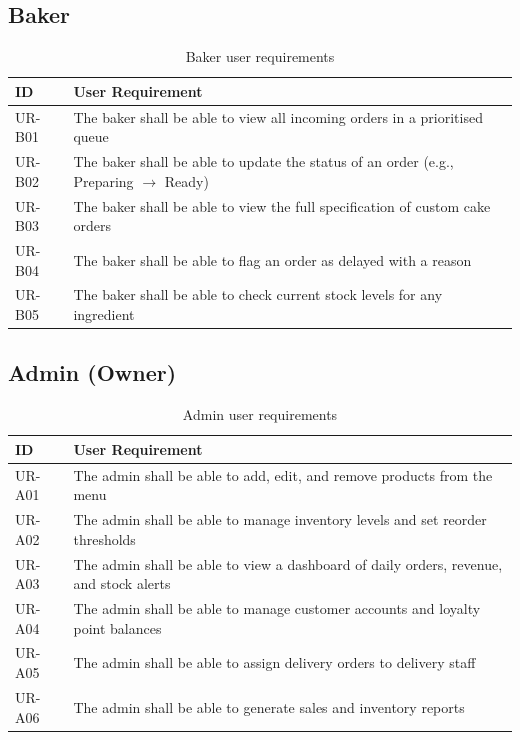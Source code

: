 \documentclass[12pt, a4paper]{report}
\begin{document}
\subsection{Baker}

\begin{table}[H]
  \centering
  \begin{tabularx}{\textwidth}{L{1.5cm} X}
    \toprule
    \textbf{ID} & \textbf{User Requirement} \\
    \midrule
    UR-B01 & The baker shall be able to view all incoming orders in a prioritised queue \\
    UR-B02 & The baker shall be able to update the status of an order (e.g., Preparing $\rightarrow$ Ready) \\
    UR-B03 & The baker shall be able to view the full specification of custom cake orders \\
    UR-B04 & The baker shall be able to flag an order as delayed with a reason \\
    UR-B05 & The baker shall be able to check current stock levels for any ingredient \\
    \bottomrule
  \end{tabularx}
  \caption{Baker user requirements}
\end{table}

\subsection{Admin (Owner)}

\begin{table}[H]
  \centering
  \begin{tabularx}{\textwidth}{L{1.5cm} X}
    \toprule
    \textbf{ID} & \textbf{User Requirement} \\
    \midrule
    UR-A01 & The admin shall be able to add, edit, and remove products from the menu \\
    UR-A02 & The admin shall be able to manage inventory levels and set reorder thresholds \\
    UR-A03 & The admin shall be able to view a dashboard of daily orders, revenue, and stock alerts \\
    UR-A04 & The admin shall be able to manage customer accounts and loyalty point balances \\
    UR-A05 & The admin shall be able to assign delivery orders to delivery staff \\
    UR-A06 & The admin shall be able to generate sales and inventory reports \\
    \bottomrule
  \end{tabularx}
  \caption{Admin user requirements}
\end{table}
\end{document}

